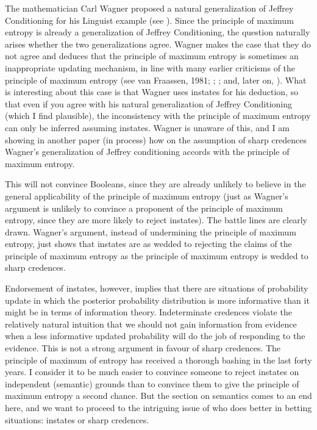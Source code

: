 \documentclass[11pt]{article}
\begin{document}
The mathematician Carl Wagner proposed a natural generalization of Jeffrey Conditioning for his Linguist example (see ). Since the principle of maximum entropy is already a generalization of Jeffrey Conditioning, the question naturally arises whether the two generalizations agree. Wagner makes the case that they do not agree and deduces that the principle of maximum entropy is sometimes an inappropriate updating mechanism, in line with many earlier criticisms of the principle of maximum entropy (see van Fraassen, 1981; ; ; and, later on, ). What is interesting about this case is that Wagner uses instates for his deduction, so that even if you agree with his natural generalization of Jeffrey Conditioning (which I find plausible), the inconsistency with the principle of maximum entropy can only be inferred assuming instates. Wagner is unaware of this, and I am showing in another paper (in process) how on the assumption of sharp credences Wagner's generalization of Jeffrey conditioning accords with the principle of maximum entropy.

This will not convince Booleans, since they are already unlikely to believe in the general applicability of the principle of maximum entropy (just as Wagner's argument is unlikely to convince a proponent of the principle of maximum entropy, since they are more likely to reject instates). The battle lines are clearly drawn. Wagner's argument, instead of undermining the principle of maximum entropy, just shows that instates are as wedded to rejecting the claims of the principle of maximum entropy as the principle of maximum entropy is wedded to sharp credences.

Endorsement of instates, however, implies that there are situations of probability update in which the posterior probability distribution is more informative than it might be in terms of information theory. Indeterminate credences violate the relatively natural intuition that we should not gain information from evidence when a less informative updated probability will do the job of responding to the evidence. This is not a strong argument in favour of sharp credences. The principle of maximum of entropy has received a thorough bashing in the last forty years. I consider it to be much easier to convince someone to reject instates on independent (semantic) grounds than to convince them to give the principle of maximum entropy a second chance. But the section on semantics comes to an end here, and we want to proceed to the intriguing issue of who does better in betting situations: instates or sharp credences.
\end{document}
